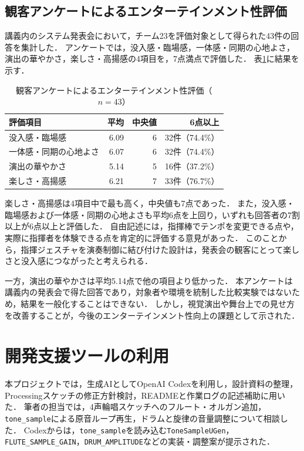 \documentclass[uplatex,dvipdfmx]{jlreq}
\begin{document}
\subsection{観客アンケートによるエンターテインメント性評価}
講義内のシステム発表会において，チーム23を評価対象として得られた43件の回答を集計した\cite{survey}．
アンケートでは，没入感・臨場感，一体感・同期の心地よさ，演出の華やかさ，楽しさ・高揚感の4項目を，7点満点で評価した．
表\ref{tab:survey}に結果を示す．

\begin{table}[tb]
\centering
\caption{観客アンケートによるエンターテインメント性評価（$n=43$）}
\label{tab:survey}
\small
\begin{tabular}{p{52mm}r r r}
\hline
評価項目 & 平均 & 中央値 & 6点以上 \\
\hline
没入感・臨場感 & 6.09 & 6 & 32件（74.4\%） \\
一体感・同期の心地よさ & 6.07 & 6 & 32件（74.4\%） \\
演出の華やかさ & 5.14 & 5 & 16件（37.2\%） \\
楽しさ・高揚感 & 6.21 & 7 & 33件（76.7\%） \\
\hline
\end{tabular}
\end{table}

楽しさ・高揚感は4項目中で最も高く，中央値も7点であった．
また，没入感・臨場感および一体感・同期の心地よさも平均6点を上回り，いずれも回答者の7割以上が6点以上と評価した．
自由記述には，指揮棒でテンポを変更できる点や，実際に指揮者を体験できる点を肯定的に評価する意見があった．
このことから，指揮ジェスチャを演奏制御に結び付けた設計は，発表会の観客にとって楽しさと没入感につながったと考えられる．

一方，演出の華やかさは平均5.14点で他の項目より低かった．
本アンケートは講義内の発表会で得た回答であり，対象者や環境を統制した比較実験ではないため，結果を一般化することはできない．
しかし，視覚演出や舞台上での見せ方を改善することが，今後のエンターテインメント性向上の課題として示された．

\section{開発支援ツールの利用}
本プロジェクトでは，生成AIとしてOpenAI Codexを利用し，設計資料の整理，Processingスケッチの修正方針検討，READMEと作業ログの記述補助に用いた．
筆者の担当では，4声輪唱スケッチへのフルート・オルガン追加，\texttt{tone\_sample}による原音ループ再生，ドラムと旋律の音量調整について相談した．
Codexからは，\texttt{tone\_sample}を読み込む\texttt{ToneSampleUGen}，\texttt{FLUTE\_SAMPLE\_GAIN}，\texttt{DRUM\_AMPLITUDE}などの実装・調整案が提示された\cite{saito-work}．
\end{document}
